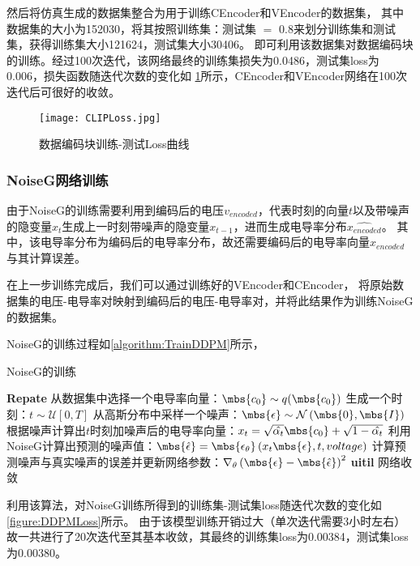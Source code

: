 然后将仿真生成的数据集整合为用于训练CEncoder和VEncoder的数据集，
其中数据集的大小为152030，将其按照训练集：测试集 $=$ 0.8来划分训练集和测试集，获得训练集大小121624，测试集大小30406。
即可利用该数据集对数据编码块的训练。经过100次迭代，该网络最终的训练集损失为0.0486，测试集loss为0.006，损失函数随迭代次数的变化如
\cref{figure:CLIPLoss}所示，CEncoder和VEncoder网络在100次迭代后可很好的收敛。
\begin{figure}[h]
    \centering
    \texttt{[image: CLIPLoss.jpg]}
    \caption{数据编码块训练-测试Loss曲线}
    \label{figure:CLIPLoss}
\end{figure}

\subsubsection{NoiseG网络训练}

由于NoiseG的训练需要利用到编码后的电压$v_{encoded}$，代表时刻的向量$t$以及带噪声的隐变量$x_t$生成上一时刻带噪声的隐变量$x_{t-1}$，进而生成电导率分布$\hat{x_{encoded}}$。
其中，该电导率分布为编码后的电导率分布，故还需要编码后的电导率向量$x_{encoded}$与其计算误差。

在上一步训练完成后，我们可以通过训练好的VEncoder和CEncoder，
将原始数据集的电压-电导率对映射到编码后的电压-电导率对，并将此结果作为训练NoiseG的数据集。

NoiseG的训练过程如\cref{algorithm:TrainDDPM}所示，

\begin{algorithm}[h]
    
    \caption{NoiseG的训练}
    \begin{algorithmic}[1]
        \State \textbf{Repate}
        \State 从数据集中选择一个电导率向量：$\mbs{c_0} \sim q(\mbs{c_0})$
        \State 生成一个时刻：$t \sim \mathcal{U}\left[0, T\right]$
        \State 从高斯分布中采样一个噪声：$\mbs{\epsilon} \sim \mathcal{N}\left(\mbs{0}, \mbs{I}\right) $
        \State 根据噪声计算出$t$时刻加噪声后的电导率向量：$x_t = \sqrt{\hat{\alpha_t}}\mbs{c_0} + \sqrt{1-\hat{\alpha_t}}$
        \State 利用NoiseG计算出预测的噪声值：$\mbs{\hat{\epsilon}} = \mbs{\epsilon_{\theta}}\left(x_t\mbs{\epsilon}, t, voltage\right)$
        \State 计算预测噪声与真实噪声的误差并更新网络参数：$\nabla_\theta\left(\mbs{\epsilon} - \mbs{\hat{\epsilon}}\right)^2$
       \State \textbf{uitil} 网络收敛
    \end{algorithmic}
    \label{algorithm:TrainDDPM}
\end{algorithm}

利用该算法，对NoiseG训练所得到的训练集-测试集loss随迭代次数的变化如\cref{figure:DDPMLoss}所示。
由于该模型训练开销过大（单次迭代需要3小时左右）故一共进行了20次迭代至其基本收敛，其最终的训练集loss为0.00384，测试集loss为0.00380。

